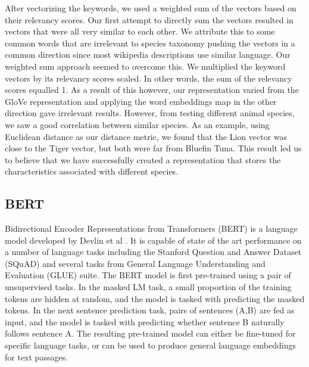 \documentclass[10pt,twocolumn,letterpaper]{article}
\begin{document}
After vectorizing the keywords, we used a weighted sum of the vectors based on their relevancy scores. Our first attempt to directly sum the vectors resulted in vectors that were all very similar to each other. We attribute this to some common words that are irrelevant to species taxonomy pushing the vectors in a common direction since most wikipedia descriptions use similar language. Our weighted sum approach seemed to overcome this. We multiplied the keyword vectors by its relevancy scores scaled. In other words, the sum of the relevancy scores equalled 1. As a result of this however, our representation varied from the GloVe representation and applying the word embeddings map in the other direction gave irrelevant results. However, from testing different animal species, we saw a good correlation between similar species. As an example, using Euclidean distance as our distance metric, we found that the Lion vector was close to the Tiger vector, but both were far from Bluefin Tuna. This result led us to believe that we have successfully created a representation that stores the characteristics associated with different species. 

\subsection{BERT}
Bidirectional Encoder Representations from Transformers (BERT) is a language model developed by Devlin et al \cite{devlin2018bert}. It is capable of state of the art performance on a number of language tasks including the Stanford Question and Answer Dataset (SQuAD) and several tasks from General Language Understanding and Evaluation (GLUE) suite. The BERT model is first pre-trained using a pair of unsupervised tasks. In the masked LM task, a small proportion of the training tokens are hidden at random, and the model is tasked with predicting the masked tokens. In the next sentence prediction task, pairs of sentences (A,B) are fed as input, and the model is tasked with predicting whether sentence B naturally follows sentence A. The resulting pre-trained model can either be fine-tuned for specific language tasks, or can be used to produce general language embeddings for text passages. 
\end{document}
